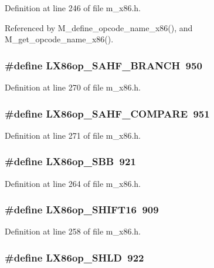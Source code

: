 Definition at line 246 of file m\_\-x86.h.

Referenced by M\_\-define\_\-opcode\_\-name\_\-x86(), and M\_\-get\_\-opcode\_\-name\_\-x86().
\subsubsection{\setlength{\rightskip}{0pt plus 5cm}\#define LX86op\_\-SAHF\_\-BRANCH~950}\label{m__x86_8h_35327e5da625ae8f422641c6e7069523}




Definition at line 270 of file m\_\-x86.h.
\subsubsection{\setlength{\rightskip}{0pt plus 5cm}\#define LX86op\_\-SAHF\_\-COMPARE~951}\label{m__x86_8h_41196c3972686ac2796cd9ce99a44941}




Definition at line 271 of file m\_\-x86.h.
\subsubsection{\setlength{\rightskip}{0pt plus 5cm}\#define LX86op\_\-SBB~921}\label{m__x86_8h_a29ee9d8cc12d1afc69ccd6e9e5a0c37}




Definition at line 264 of file m\_\-x86.h.
\subsubsection{\setlength{\rightskip}{0pt plus 5cm}\#define LX86op\_\-SHIFT16~909}\label{m__x86_8h_844cb6466e398376cd0c58b2d31fd8f1}




Definition at line 258 of file m\_\-x86.h.
\subsubsection{\setlength{\rightskip}{0pt plus 5cm}\#define LX86op\_\-SHLD~922}\label{m__x86_8h_026239a1847dd91bec079a409ff20540}




